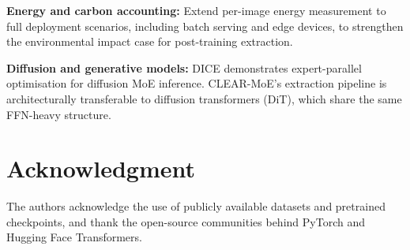 \documentclass[conference]{IEEEtran}
\begin{document}
\textbf{Energy and carbon accounting:} Extend per-image energy measurement to full deployment scenarios, including batch serving and edge devices, to strengthen the environmental impact case for post-training extraction.

\textbf{Diffusion and generative models:} DICE \cite{dice2025} demonstrates expert-parallel optimisation for diffusion MoE inference. CLEAR-MoE's extraction pipeline is architecturally transferable to diffusion transformers (DiT), which share the same FFN-heavy structure.

\section*{Acknowledgment}
The authors acknowledge the use of publicly available datasets and pretrained checkpoints, and thank the open-source communities behind PyTorch and Hugging Face Transformers.
\end{document}
